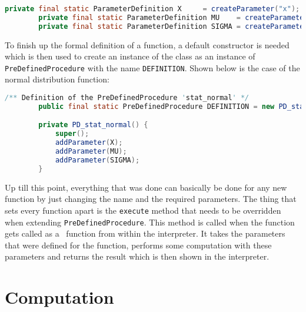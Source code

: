 \begin{center}
	\begin{lstlisting}[caption={Parameter Definition}, language={java}, label=lis:parameterDefinition]
		private final static ParameterDefinition X     = createParameter("x");
		private final static ParameterDefinition MU    = createParameter("mu");
		private final static ParameterDefinition SIGMA = createParameter("sigma");
	\end{lstlisting}
\end{center}

To finish up the formal definition of a function, a default constructor is needed which is then used to create an instance of the class as an instance of \lstinline{PreDefinedProcedure} with the name \lstinline{DEFINITION}. Shown below is the case of the normal distribution function:

\begin{center}
	\begin{lstlisting}[caption={Constructor and Function Definition}, language={java}, label=lis:constructor]
		/** Definition of the PreDefinedProcedure 'stat_normal' */
		public final static PreDefinedProcedure DEFINITION = new PD_stat_normal();

		private PD_stat_normal() {
			super();
			addParameter(X);
			addParameter(MU);
			addParameter(SIGMA);
		}
	\end{lstlisting}
\end{center}

Up till this point, everything that was done can basically be done for any new function by just changing the name and the required parameters. The thing that sets every function apart is the \lstinline{execute} method that needs to be overridden when extending \lstinline{PreDefinedProcedure}. This method is called when the function gets called as a \setlx\ function from within the interpreter. It takes the parameters that were defined for the function, performs some computation with these parameters and returns the result which is then shown in the interpreter.

\section{Computation}

